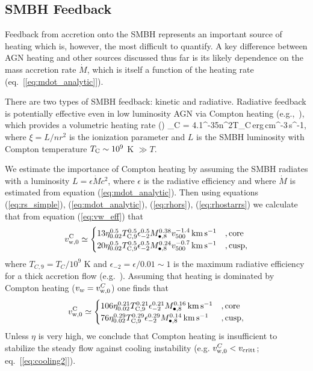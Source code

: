 \documentclass[usenatbib,fleqn]{mn2e}
\begin{document}
\subsection{SMBH Feedback}

Feedback from accretion onto the SMBH represents an important source of heating which is, however, the most difficult to quantify.  A key difference between AGN heating and other sources discussed thus far is its likely dependence on the mass accretion rate $\dot{M}$, which is itself a function of the heating rate (eq.~[\ref{eq:mdot_analytic}]).  

There are two types of SMBH feedback: kinetic and radiative.  Radiative feedback is potentially effective even in low luminosity AGN via Compton heating (e.g.,~\citealt{Gan+14}), which provides a volumetric heating rate (\citealt{Gan+14})
\be
{}_{\rm C} = 4.1^{-35}n^{2}\xi T_{\rm C}\,{\rm erg\,cm^{-3}\,s^{-1}},
\ee
where $\xi = L/n r^{2}$ is the ionization parameter and $L$ is the SMBH luminosity with Compton temperature $T_{\rm C} \sim 10^{9}$ K $\gg T$.  

We estimate the importance of Compton heating by assuming the SMBH radiates with a luminosity $L = \epsilon \dot{M}c^{2}$, where $\epsilon$ is the radiative efficiency and where $\dot{M}$ is estimated from equation (\ref{eq:mdot_analytic}).  Then using equations (\ref{eq:rs_simple}), (\ref{eq:mdot_analytic}), (\ref{eq:rhors}), (\ref{eq:rhostarrs}) we calculate that from equation (\ref{eq:vw_eff}) that
\begin{align}
v_{\rm w,0}^{\rm C}  \simeq
  \begin{cases}
   13 \eta_{0.02}^{0.5}T_{\rm C,9}^{0.5}\epsilon_{-2}^{0.5} M_{\bullet,8}^{0.38}v_{500}^{-1.4}\,{\rm km\,s^{-1}}  &, \text{core}\\
   20 \eta_{0.02}^{0.5}T_{\rm C,9}^{0.5}\epsilon_{-2}^{0.5} M_{\bullet,8}^{0.24}v_{500}^{-0.7}\,{\rm km\,s^{-1}}   &, \text{cusp},     
  \end{cases}
  \label{eq:vC}
\end{align}
where $T_{C,9} = T_{C}/10^{9}$ K and $\epsilon_{-2} = \epsilon/0.01 \sim 1$ is the maximum radiative efficiency for a thick accretion flow (e.g.~\citealt{Narayan&Yi95}).  Assuming that heating is dominated by Compton heating ($v_{w} = v_{\rm w,0}^{C}$) one finds that
\begin{align}
v_{\rm w,0}^{\rm C}  \simeq
  \begin{cases}
   106 \eta_{0.02}^{0.21}T_{\rm C,9}^{0.21}\epsilon_{-2}^{0.21} M_{\bullet,8}^{0.16}\,{\rm km\,s^{-1}}  &, \text{core}\\
   76 \eta_{0.02}^{0.29}T_{\rm C,9}^{0.29}\epsilon_{-2}^{0.29} M_{\bullet,8}^{0.14}\,{\rm km\,s^{-1}}   &, \text{cusp},     
  \end{cases}
  \label{eq:vC2}
\end{align}
Unless $\eta$ is very high, we conclude that Compton heating is insufficient to stabilize the steady flow against cooling instability (e.g. $v_{\rm w,0}^{C} < v_{\rm critt}$; eq.~[\ref{eq:cooling2}]).  
\end{document}
